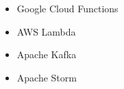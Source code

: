 \begin{itemize}
	\item Google Cloud Functions
	\item AWS Lambda
	\item Apache Kafka
	\item Apache Storm
\end{itemize}